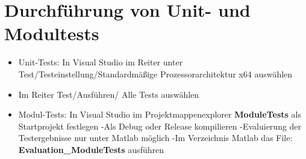 \documentclass[
11pt,				%
a4paper,			%
DIV12,		     	%
liststotoc,			%
bibliography=totoc, %
listof=entryprefix, %
listot=entryprefix, %
appendixprefix=true,
pointlessnumbers,
	oneside,		%
]{scrbook}
\begin{document}
\section{Durchführung von Unit- und Modultests}
\begin{itemize}
	\item Unit-Tests: In Visual Studio im Reiter unter Test/Testeinstellung/Standardmäßige Prozessorarchitektur x64 auswählen
	\item Im Reiter Test/Ausführen/ Alle Tests auswählen
	\item Modul-Tests: In Visual Studio im Projektmappenexplorer \textbf{ModuleTests} als Startprojekt festlegen
	\subitem -Als Debug oder Release kompilieren 
	\subitem -Evaluierung der Testergebnisse nur unter Matlab möglich
	\subitem -Im Verzeichnis Matlab das File: \textbf{Evaluation\_ModuleTests} ausführen
\end{itemize} 
\end{document}
